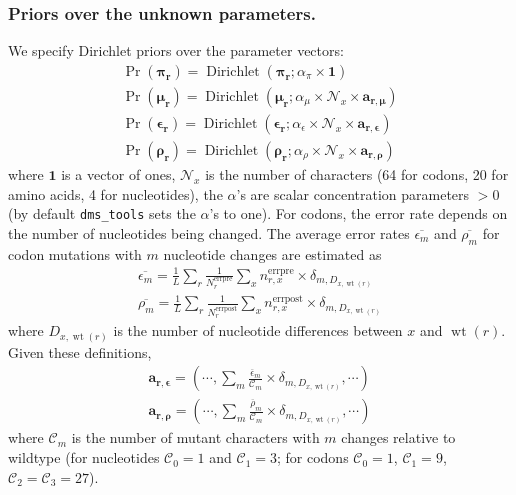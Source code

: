 \documentclass[twocolumn]{bmcart}%
\begin{document}
\subsubsection*{Priors over the unknown parameters.}
We specify Dirichlet priors over the parameter vectors:
\begin{gather}
\Pr\left(\boldsymbol{\mathbf{\pi_r}}\right) = \operatorname{Dirichlet}\left(\boldsymbol{\mathbf{\pi_r}}; \alpha_{\pi} \times \mathbf{1}\right)   \label{eq:pr_pir} \\
\Pr\left(\boldsymbol{\mathbf{\mu_r}}\right) = \operatorname{Dirichlet}\left(\boldsymbol{\mathbf{\mu_r}}; \alpha_{\mu} \times \mathcal{N}_x \times \boldsymbol{\mathbf{a_{r,\mu}}}\right) \label{eq:pr_mur} \\
\Pr\left(\boldsymbol{\mathbf{\epsilon_r}}\right) = \operatorname{Dirichlet}\left(\boldsymbol{\mathbf{\epsilon_r}}; \alpha_{\epsilon} \times \mathcal{N}_x \times \boldsymbol{\mathbf{a_{r,\epsilon}}}\right) \label{eq:pr_epsilonr} \\
\Pr\left(\boldsymbol{\mathbf{\rho_r}}\right) = \operatorname{Dirichlet}\left(\boldsymbol{\mathbf{\rho_r}}; \alpha_{\rho} \times \mathcal{N}_x \times
 \boldsymbol{\mathbf{a_{r,\rho}}}\right) \label{eq:pr_rhor}
\end{gather}
where $\mathbf{1}$ is a vector of ones, $\mathcal{N}_x$ is the number of characters (64 for codons, 20 for amino acids, 4 for nucleotides), the $\alpha$'s are scalar concentration parameters $> 0$ (by default \texttt{dms\_tools} sets the $\alpha$'s to one). For codons, the error rate depends on the number of nucleotides being changed. The average error rates $\overline{\epsilon_m}$ and $\overline{\rho_m}$ for codon mutations with $m$ nucleotide changes are estimated as
\begin{gather}
\overline{\epsilon_m} = \frac{1}{L}\sum\limits_r \frac{1}{N_r^{\textrm{errpre}}}\sum\limits_{x} n_{r,x}^{\textrm{errpre}}\times \delta_{m,D_{x,\operatorname{wt}\left(r\right)}} \label{eq:avgepsilonm} \\
\overline{\rho_m} = \frac{1}{L}\sum\limits_r \frac{1}{N_r^{\textrm{errpost}}}\sum\limits_{x} n_{r,x}^{\textrm{errpost}}\times \delta_{m,D_{x,\operatorname{wt}\left(r\right)}} \label{eq:avgrhom}
\end{gather}
where $D_{x,\operatorname{wt}\left(r\right)}$ is the number of nucleotide differences between $x$ and $\operatorname{wt}\left(r\right)$. Given these definitions, 
\begin{gather}
\boldsymbol{\mathbf{a_{r,\epsilon}}} = \left(\cdots, \sum\limits_m \frac{\overline{\epsilon}_{m}}{\mathcal{C}_m} \times \delta_{m,D_{x,\operatorname{wt}\left(r\right)}},\cdots\right) \label{eq:arepsilon} \\
\boldsymbol{\mathbf{a_{r,\rho}}} = \left(\cdots, \sum\limits_m \frac{\overline{\rho}_{m}}{\mathcal{C}_m} \times \delta_{m,D_{x,\operatorname{wt}\left(r\right)}}, \cdots\right) \label{eq:arrho} 
\end{gather}
where $\mathcal{C}_m$ is the number of mutant characters with $m$ changes relative to wildtype (for nucleotides $\mathcal{C}_0 = 1$ and $\mathcal{C}_1 = 3$; for codons $\mathcal{C}_0 = 1$, $\mathcal{C}_1 = 9$, $\mathcal{C}_2 = \mathcal{C}_3 = 27$).
\end{document}
